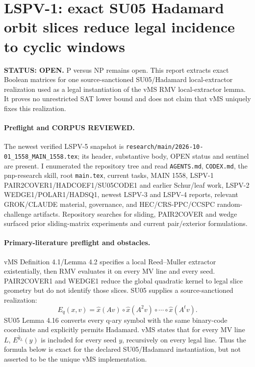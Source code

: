 \documentclass[11pt]{article}
\begin{document}
\section*{LSPV-1: exact SU05 Hadamard orbit slices reduce legal incidence to cyclic windows}
\textbf{STATUS: OPEN.} P versus NP remains open. This report extracts exact Boolean matrices for one source-sanctioned SU05/Hadamard local-extractor realization used as a legal instantiation of the vMS RMV local-extractor lemma. It proves no unrestricted SAT lower bound and does not claim that vMS uniquely fixes this realization.

\paragraph{Preflight and CORPUS REVIEWED.}
The newest verified LSPV-5 snapshot is \texttt{research/main/2026-10-01_1558_MAIN_1558.tex}; its header, substantive body, OPEN status and sentinel are present. I enumerated the repository tree and read \texttt{AGENTS.md}, \texttt{CODEX.md}, the pnp-research skill, root \texttt{main.tex}, current tasks, MAIN 1558, LSPV-1 PAIR2COVER1/HADCOEF1/SU05CODE1 and earlier Schur/leaf work, LSPV-2 WEDGE1/POLAR1/HADSQ1, newest LSPV-3 and LSPV-4 reports, relevant GROK/CLAUDE material, governance, and HEC/CRS-PPC/CCSPC random-challenge artifacts. Repository searches for sliding, PAIR2COVER and wedge surfaced prior sliding-matrix experiments and current pair/exterior formulations.

\paragraph{Primary-literature preflight and obstacles.}
vMS Definition 4.1/Lemma 4.2 specifies a local Reed--Muller extractor existentially, then RMV evaluates it on every MV line and every seed. PAIR2COVER1 and WEDGE1 reduce the global quadratic kernel to legal slice geometry but do not identify those slices. SU05 supplies a source-sanctioned realization:
\[
E_q(x,v)=\widehat x(Av)\circ\widehat x(A^2v)\circ\cdots\circ\widehat x(A^t v).
\]
SU05 Lemma 4.16 converts every q-ary symbol with the same binary-code coordinate and explicitly permits Hadamard. vMS states that for every MV line \(L\), \(E^{\widehat g_L}(y)\) is included for every seed \(y\), recursively on every legal line. Thus the formula below is exact for the declared SU05/Hadamard instantiation, but not asserted to be the unique vMS implementation.
\end{document}
